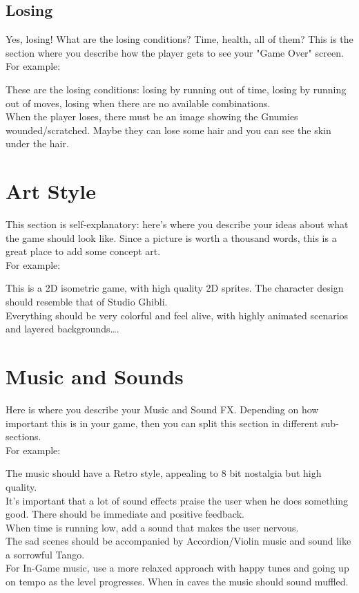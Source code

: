 \documentclass[12pt, a4paper]{article}
\begin{document}
\subsection{Losing}
Yes, losing! What are the losing conditions? Time, health, all of them? This is the section where you describe how the player gets to see your "Game Over" screen.\\

For example:
\begin{tcolorbox}
These are the losing conditions: losing by running out of time, losing by running out of moves, losing when there are no available combinations.\\

When the player loses, there must be an image showing the Gnumies wounded/scratched. Maybe they can lose some hair and you can see the skin under the hair.
\end{tcolorbox}

\section{Art Style}
This section is self-explanatory: here’s where you describe your ideas about what the game should look like. Since a picture is worth a thousand words, this is a great place to add some concept art.\\

For example:
\begin{tcolorbox}
This is a 2D isometric game, with high quality 2D sprites. The character design should resemble that of Studio Ghibli.\\

Everything should be very colorful and feel alive, with highly animated scenarios and layered backgrounds….
\end{tcolorbox}

\section{Music and Sounds}
Here is where you describe your Music and Sound FX. Depending on how important this is in your game, then you can split this section in different sub-sections.\\

For example:
\begin{tcolorbox}
The music should have a Retro style, appealing to 8 bit nostalgia but high quality.\\

It’s important that a lot of sound effects praise the user when he does something good. There should be immediate and positive feedback.\\

When time is running low, add a sound that makes the user nervous.\\

The sad scenes should be accompanied by Accordion/Violin music and sound like a sorrowful Tango.\\

For In-Game music, use a more relaxed approach with happy tunes and going up on tempo as the level progresses. When in caves the music should sound muffled.
\end{tcolorbox}
\end{document}
